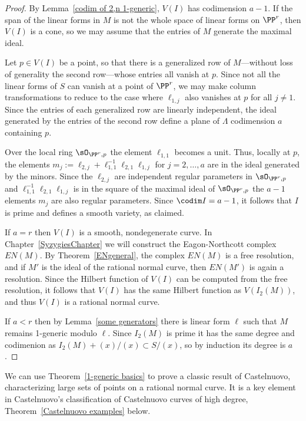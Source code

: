 \begin{proof}  By Lemma~\ref{codim of 2,n 1-generic},  $V(I)$ has codimension $a-1$.
If the span of the linear forms in $M$ is not the whole space of linear forms on $\PP^r$, then $V(I)$ is a cone,
so we may assume that the entries of $M$ generate the maximal ideal.

 Let $p\in V(I)$ be a point, so that there is a generalized row of $M$---without loss of generality the second row---whose 
 entries all vanish
at $p$. Since not all the linear forms
of $S$ can vanish at a point of $\PP^r$, we may make column transformations to reduce to the case where
$\ell_{1,j}$ also vanishes at $p$ for all $j\neq 1$. Since the entries
of each generalized row are linearly independent, the ideal generated by the entries of the second row define a plane of
$\Lambda$ codimension $a$ containing $p$. 

Over the local ring $\sO_{\PP^r, p}$ the element $\ell_{1,1}$ becomes a unit.
Thus, locally at $p$, the elements $m_{j}:= \ell_{2,j}+ \ell_{1,1}^{-1}\ell_{2,1}\ell_{1,j}$ for $j=2,\dots, a$ are in the ideal generated
by the minors. Since the $\ell_{2,j}$ are independent regular parameters in $\sO_{\PP^r, p}$ and 
$\ell_{1,1}^{-1}\ell_{2,1}\ell_{1,j}$ is in the square of the maximal ideal of $\sO_{\PP^r, p}$ the
$a-1$ elements $m_{j}$
are also regular parameters. Since $\codim I = a-1$, it follows that $I$ is prime and defines a smooth variety, as claimed.

If $a=r$ then $V(I)$ is a smooth, nondegenerate curve. In Chapter~\ref{SyzygiesChapter} we will construct the Eagon-Northcott complex $EN(M)$. By Theorem~\ref{ENgeneral}, the complex $EN(M)$ is a free resolution,
and if $M'$ is the ideal of the rational normal curve, then $EN(M')$ is again a resolution. Since the Hilbert
function of $V(I)$ can be computed from the free resolution, it follows that $V(I)$ has the same Hilbert function
as $V(I_2(M))$, and thus $V(I)$ is a rational normal curve.

If $a<r$ then by Lemma~\ref{some generators} there is linear form $\ell$ such that $M$ remains 1-generic modulo $\ell$.
Since $I_2(M)$ is prime it has the same degree and codimenion as $I_2(M) +(x)/(x) \subset S/(x)$, so by induction its degree
is $a$.
\end{proof}

We can use Theorem~\ref{1-generic basics} to prove a classic result of Castelnuovo, characterizing large sets of 
points on a rational normal curve. It is a key element in Castelnuovo's classification of Castelnuovo curves of high
degree, Theorem~\ref{Castelnuovo examples} below.

